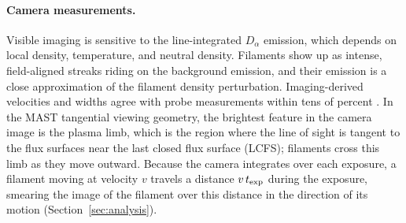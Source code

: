 \paragraph{Camera measurements.}
Visible imaging is sensitive to the line-integrated $D_\alpha$ emission, which depends on local density, temperature, and neutral density. Filaments show up as intense, field-aligned streaks riding on the background emission, and their emission is a close approximation of the filament density perturbation. Imaging-derived velocities and widths agree with probe measurements within tens of percent \citep{zweben2007edge, benayed2009interelm}. In the MAST tangential viewing geometry, the brightest feature in the camera image is the plasma limb, which is the region where the line of sight is tangent to the flux surfaces near the last closed flux surface (LCFS); filaments cross this limb as they move outward. Because the camera integrates over each exposure, a filament moving at velocity $v$ travels a distance $v\,t_{\rm exp}$ during the exposure, smearing the image of the filament over this distance in the direction of its motion (Section~\ref{sec:analysis}).
